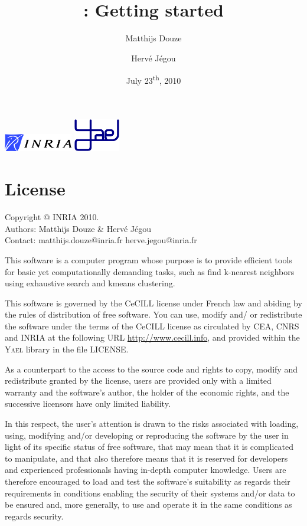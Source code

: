 \documentclass[a4paper,11pt,notitlepage,final,twoside]{report}
\title{~\vspace{9cm} \\ \yael: Getting started}
\author{Matthijs Douze \and Herv\'e J\'egou}
\date{July 23\textsuperscript{th}, 2010}
\newcommand{\yael}{\textsc{Yael}\xspace}
\begin{document}
\maketitle
\thispagestyle{empty}

\vfill

\includegraphics[width=3cm]{./figs/logoinria} \hfill \includegraphics[width=2cm]{./figs/logoyael} 


\newpage

\chapter*{License}

\thispagestyle{empty}

Copyright @ INRIA 2010. \\
Authors: Matthijs Douze \& Herv\'e J\'egou \\
Contact: matthijs.douze@inria.fr  herve.jegou@inria.fr \\
\medskip

This software is a computer program whose purpose is to provide 
efficient tools for basic yet computationally demanding tasks, 
such as find k-nearest neighbors using exhaustive search 
and kmeans clustering. 
\medskip

This software is governed by the CeCILL license under French law and
abiding by the rules of distribution of free software.  You can  use, 
modify and/ or redistribute the software under the terms of the CeCILL
license as circulated by CEA, CNRS and INRIA at the following URL
\url{http://www.cecill.info}, and provided within the \yael library 
in the file LICENSE. 
\medskip

As a counterpart to the access to the source code and  rights to copy,
modify and redistribute granted by the license, users are provided only
with a limited warranty  and the software's author,  the holder of the
economic rights,  and the successive licensors  have only  limited
liability. 
\medskip

In this respect, the user's attention is drawn to the risks associated
with loading,  using,  modifying and/or developing or reproducing the
software by the user in light of its specific status of free software,
that may mean  that it is complicated to manipulate,  and  that  also
therefore means  that it is reserved for developers  and  experienced
professionals having in-depth computer knowledge. Users are therefore
encouraged to load and test the software's suitability as regards their
requirements in conditions enabling the security of their systems and/or 
data to be ensured and,  more generally, to use and operate it in the 
same conditions as regards security. 
\medskip
\end{document}
